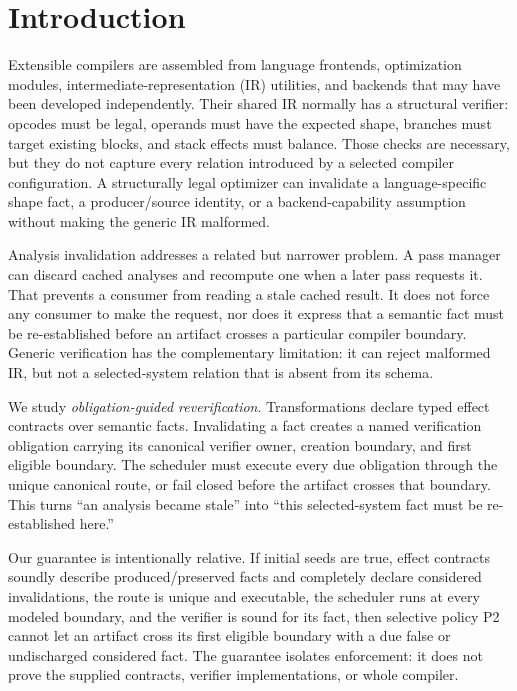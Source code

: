 \section{Introduction}
Extensible compilers are assembled from language frontends, optimization modules, intermediate-representation (IR) utilities, and backends that may have been developed independently. Their shared IR normally has a structural verifier: opcodes must be legal, operands must have the expected shape, branches must target existing blocks, and stack effects must balance. Those checks are necessary, but they do not capture every relation introduced by a selected compiler configuration. A structurally legal optimizer can invalidate a language-specific shape fact, a producer/source identity, or a backend-capability assumption without making the generic IR malformed.

Analysis invalidation addresses a related but narrower problem. A pass manager can discard cached analyses and recompute one when a later pass requests it. That prevents a consumer from reading a stale cached result. It does not force any consumer to make the request, nor does it express that a semantic fact must be re-established before an artifact crosses a particular compiler boundary. Generic verification has the complementary limitation: it can reject malformed IR, but not a selected-system relation that is absent from its schema.

We study \emph{obligation-guided reverification}. Transformations declare typed effect contracts over semantic facts. Invalidating a fact creates a named verification obligation carrying its canonical verifier owner, creation boundary, and first eligible boundary. The scheduler must execute every due obligation through the unique canonical route, or fail closed before the artifact crosses that boundary. This turns ``an analysis became stale'' into ``this selected-system fact must be re-established here.''

Our guarantee is intentionally relative. If initial seeds are true, effect contracts soundly describe produced/preserved facts and completely declare considered invalidations, the route is unique and executable, the scheduler runs at every modeled boundary, and the verifier is sound for its fact, then selective policy P2 cannot let an artifact cross its first eligible boundary with a due false or undischarged considered fact. The guarantee isolates enforcement: it does not prove the supplied contracts, verifier implementations, or whole compiler.

